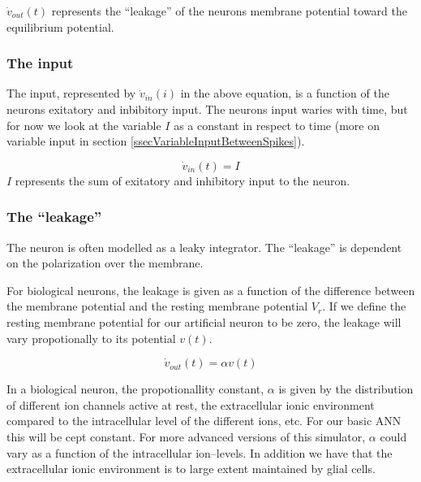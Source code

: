 $\dot{v}_{out}(t)$ represents the ``leakage'' of the neurons membrane potential toward the equilibrium potential.


\subsubsection{The input}
The input, represented by $\dot{v}_{in}(i)$ in the above equation, is a function of the neurons exitatory and inbibitory input. 
The neurons input waries with time, but for now we look at the variable $I$ as a constant in respect to time 
(more on variable input in section \ref{ssecVariableInputBetweenSpikes}).

\begin{equation}
	\dot{v}_{in}(t) = I
\end{equation}
$I$ represents the sum of exitatory and inhibitory input to the neuron.



\subsubsection{The ``leakage''}
The neuron is often modelled as a leaky integrator. The ``leakage'' is dependent on the polarization over the membrane. 

For biological neurons, the leakage is given as a function of the difference between the membrane potential and the resting membrane potential $V_r$. 
If we define the resting membrane potential for our artificial neuron to be zero, the leakage will vary propotionally to its potential $v(t)$.

\begin{equation}
	\dot{v}_{out}(t) = \alpha v(t)
\end{equation}

In a biological neuron, the propotionallity constant, $\alpha$ is given by the distribution of different ion channels active at rest, the extracellular ionic environment compared to the intracellular level of the different ions, etc.
For our basic ANN this will be cept constant. For more advanced versions of this simulator, $\alpha$ could vary as a function of the intracellular ion--levels. 
In addition we have that the extracellular ionic environment is to large extent maintained by glial cells.


